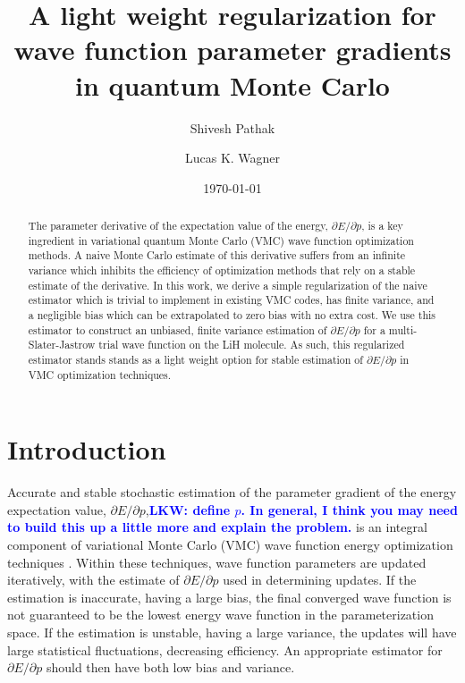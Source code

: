 \documentclass[twocolumn]{revtex4-1}
\newcommand{\lucas}[1]{\textbf{\textcolor{blue}{LKW: #1}}}
\begin{document}
\title{A light weight regularization for wave function parameter gradients
\\ in quantum Monte Carlo}

\author{Shivesh Pathak}

\author{Lucas K. Wagner}

\date{\today}
\begin{abstract}
The parameter derivative of the expectation value of the energy, $\partial E/\partial p$, is a key ingredient in variational quantum Monte Carlo (VMC) wave function optimization methods.
A naive Monte Carlo estimate of this derivative suffers from an infinite variance which inhibits the efficiency of optimization methods that rely on a stable estimate of the derivative.
In this work, we derive a simple regularization of the naive estimator which is trivial to implement in existing VMC codes, has finite variance, and a negligible bias which can be extrapolated to zero bias with no extra cost.
We use this estimator to construct an unbiased, finite variance estimation of $\partial E/\partial p$ for a multi-Slater-Jastrow trial wave function on the LiH molecule.
As such, this regularized estimator stands stands as a light weight option for stable estimation of $\partial E/\partial p$ in VMC optimization techniques.
\end{abstract}
\maketitle 

\section{Introduction}
Accurate and stable stochastic estimation of the parameter gradient of the energy expectation value, $\partial E/\partial p$,\lucas{define $p$. In general, I think you may need to build this up a little more and explain the problem.} is an integral component of variational Monte Carlo (VMC) wave function energy optimization techniques \cite{PhysRevB.64.024512, doi:10.1063/1.1604379, Toulouse2007, Umrigar2005, Umrigar2007, Toulouse2008}.
Within these techniques, wave function parameters are updated iteratively, with the estimate of $\partial E/\partial p$ used in determining updates.
If the estimation is inaccurate, having a large bias, the final converged wave function is not guaranteed to be the lowest energy wave function in the parameterization space.
If the estimation is unstable, having a large variance, the updates will have large statistical fluctuations, decreasing efficiency.
An appropriate estimator for $\partial E/ \partial p$ should then have both low bias and variance.
\end{document}

